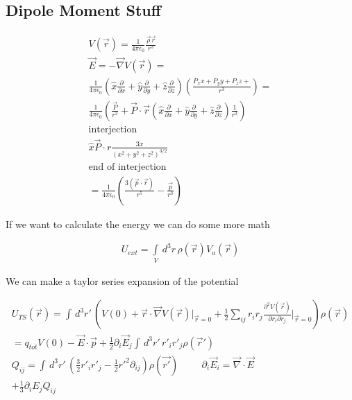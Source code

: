 \documentclass[fleqn]{report}
\newcommand{\hp}{\hspace{1cm}}
\newcommand{\del}{\partial}
\newcommand{\equations} [1] {
\begin{gather*}
#1
\end{gather*}
}
\begin{document}
\subsection{Dipole Moment Stuff}
\equations{
    V(\vec r) = 
    \frac{1}{4 \pi \epsilon_0} 
    \frac{\vec \rho \vec r}{r^3}
    \\
    \vec E = - \vec \nabla V(\vec r)
    =
    \\
    \frac{1}{4 \pi \epsilon_0} 
    \left(
        \hat x \frac{\del}{\del x}
        +
        \hat y \frac{\del}{\del y}
        +
        \hat z \frac{\del}{\del z}
    \right)
    \left(
        \frac{P_{x} x + P_{y} y + P_{z} z + }{r^3}
    \right)
    =
    \\
    \frac{1}{4 \pi \epsilon_0} 
    \left(
        \frac{\vec P}{r^3}
        +
        \vec P \cdot \vec r 
        \left(
            \hat x \frac{\del}{\del x}
            +
            \hat y \frac{\del}{\del y}
            +
            \hat z \frac{\del}{\del z}
        \right)
        \frac{1}{r^3}
    \right)
    \\
    \textrm{interjection}
    \\
    \hat x \vec P \cdot r 
    \frac{3x}{
        (x^2 + y^2 + z^2)^{3/2}
    }
    \\
    \textrm{end of interjection}
    \\
    =
    \frac{1}{4 \pi \epsilon_0} 
    \left(
        \frac{3 (\vec p \cdot \vec r)}{r^5}
        -
        \frac{\vec p}{r^3}
    \right)
}

If we want to calculate the energy we can do some more math 
\equations{
    U_{ext}
    =
    \int\limits_V \, d^3 r \, 
    \rho(\vec r) V_{a}(\vec r)
}

We can make a taylor series expansion of the potential 
\equations{
    U_{TS}(\vec r)
    =
    \int \, d^3 r' \, 
    \left(
        V(0)
        +
        \vec r \cdot \vec \nabla V(\vec r) 
        \Big|_{\vec r = 0}
        +
        \frac{1}{2}
        \sum_{ij}
        r_i r_j
        \frac{\del^2 V(\vec r)}{\del r_i \del r_j}
        \Big|_{\vec r = 0}
    \right)
    \rho(\vec r)
    \\
    =
    q_{tot} V(0)
    - 
    \vec E \cdot \vec p
    +
    \frac{1}{2} 
    \del_i
    \vec E_j 
    \int \, d^3 r' \, 
    r'_i r'_j \rho(\vec r')
    \\
    Q_{ij} 
    =
    \int \, d^3 r' \, 
    \left(
        \frac{3}{2} 
        r'_i r'_j 
        -
        \frac{1}{2}
        {r'}^2 \del_{ij}
    \right)
    \rho(\vec{r'})
    \hp 
    \del_i \vec E_i = \vec \nabla \cdot \vec E 
    \\
    + \frac{1}{3} \del_i E_j Q_{ij}
}
\end{document}
